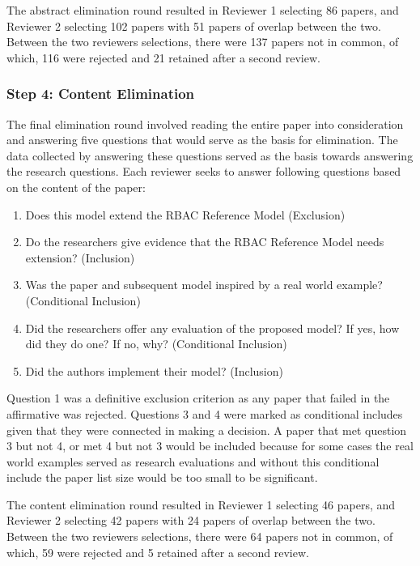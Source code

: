 The abstract elimination round resulted in Reviewer 1 selecting 86 papers, and Reviewer 2 selecting 102 papers with 51 papers of overlap between the two. 
Between the two reviewers selections, there were 137 papers not in common, of which, 116 were rejected and 21 retained after a second review.

\subsubsection{Step 4: Content Elimination}

The final elimination round involved reading the entire paper into consideration and answering five questions that would serve as the basis for elimination.  The data collected by answering these questions served as the basis towards answering the research questions.  Each reviewer seeks to answer following questions based on the content of the paper:

\begin{enumerate}
\setlength{\itemsep}{0.25pt}
\item Does this model extend the RBAC Reference Model (Exclusion)
\item Do the researchers give evidence that the RBAC Reference Model needs extension? (Inclusion)
\item Was the paper and subsequent model inspired by a real world example?  (Conditional Inclusion)
\item Did the researchers offer any evaluation of the proposed model? If yes, how did they do one? If no, why? (Conditional Inclusion)
\item Did the authors implement their model? (Inclusion)
\end{enumerate}

Question 1 was a definitive exclusion criterion as any paper that failed in the affirmative was rejected.  Questions 3 and 4 were marked as conditional includes given that they were connected in making a decision. 
A paper that met question 3 but not 4, or met 4 but not 3 would be included because for some cases the real world examples served as research evaluations and without this conditional include the paper list size would be too small to be significant.

The content elimination round resulted in Reviewer 1 selecting 46 papers, and Reviewer 2 selecting 42 papers with 24 papers of overlap between the two. 
Between the two reviewers selections, there were 64 papers not in common, of which, 59 were rejected and 5 retained after a second review.

